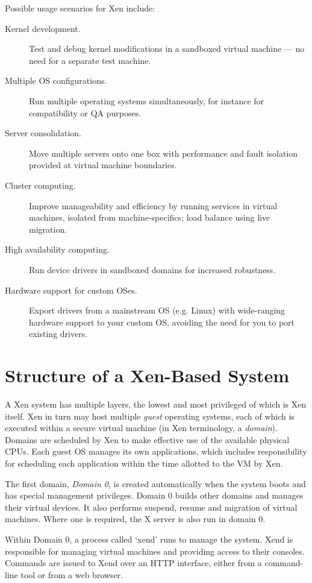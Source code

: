 \documentclass[11pt,twoside,final,openright]{xenstyle}
\begin{document}
Possible usage scenarios for Xen include:
\begin{description}
\item [Kernel development.] Test and debug kernel modifications in a
      sandboxed virtual machine --- no need for a separate test
      machine.
\item [Multiple OS configurations.] Run multiple operating systems
      simultaneously, for instance for compatibility or QA purposes.
\item [Server consolidation.] Move multiple servers onto one box
      with performance and fault isolation provided at virtual machine
      boundaries. 
\item [Cluster computing.] Improve manageability and efficiency by
      running services in virtual machines, isolated from
      machine-specifics; load balance using live migration.
\item [High availability computing.] Run device drivers in sandboxed
      domains for increased robustness.
\item [Hardware support for custom OSes.] Export drivers from a
      mainstream OS (e.g. Linux) with wide-ranging hardware support
      to your custom OS, avoiding the need for you to port existing
      drivers.
\end{description}

\section{Structure of a Xen-Based System}

A Xen system has multiple layers, the lowest and most privileged of
which is Xen itself. Xen in turn may host multiple {\em guest}
operating systems, each of which is executed within a secure virtual
machine (in Xen terminology, a {\em domain}). Domains are scheduled by
Xen to make effective use of the available physical CPUs.  Each guest
OS manages its own applications, which includes responsibility for
scheduling each application within the time allotted to the VM by Xen.

The first domain, {\em Domain 0}, is created automatically when the
system boots and has special management privileges. Domain 0 builds
other domains and manages their virtual devices. It also performs
suspend, resume and migration of virtual machines. Where one is
required, the X server is also run in domain 0.

Within Domain 0, a process called `xend' runs to manage the system.
Xend is responsible for managing virtual machines and providing access
to their consoles.  Commands are issued to Xend over an HTTP
interface, either from a command-line tool or from a web browser.
\end{document}
